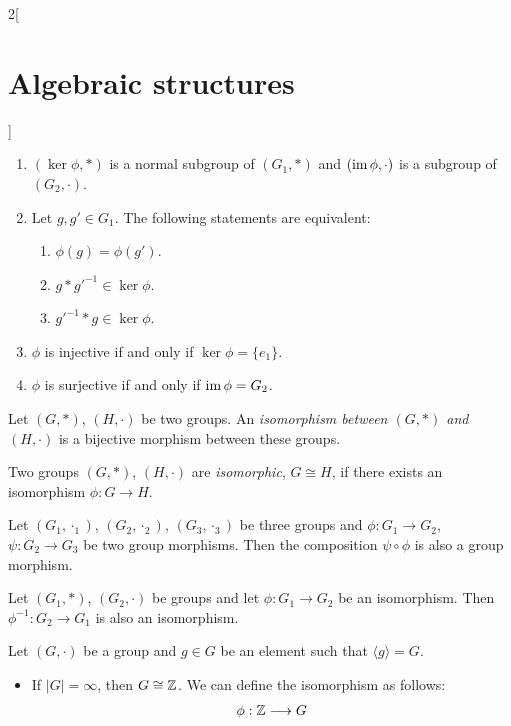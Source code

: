 \documentclass[../../../main.tex]{subfiles}
\begin{document}
\begin{multicols}{2}[\section{Algebraic structures}]
\begin{prop}
    \begin{enumerate}
        \item $(\ker\phi,*)$ is a normal subgroup of $(G_1,*)$ and $(\operatorname{im}\phi,\cdot)$ is a subgroup of $(G_2,\cdot)$.
        \item Let $g,g'\in G_1$. The following statements are equivalent:
        \begin{enumerate}
            \item $\phi(g)=\phi(g')$.
            \item $g*g'^{-1}\in\ker\phi$.
            \item $g'^{-1}*g\in\ker\phi$.
        \end{enumerate}
        \item $\phi$ is injective if and only if $\ker\phi=\{e_1\}$.
        \item $\phi$ is surjective if and only if $\operatorname{im}\phi=G_2$.
    \end{enumerate}
\end{prop}
\begin{definition}
    Let $(G,*)$, $(H,\cdot)$ be two groups. An \textit{isomorphism between $(G,*)$ and $(H,\cdot)$} is a bijective morphism between these groups.
\end{definition}
\begin{definition}
    Two groups $(G,*)$, $(H,\cdot)$ are \textit{isomorphic}, $G\cong H$, if there exists an isomorphism $\phi:G\rightarrow H$.
\end{definition}
\begin{prop}
    Let $(G_1,\cdot_1)$, $(G_2,\cdot_2)$, $(G_3,\cdot_3)$ be three groups and $\phi:G_1\rightarrow G_2$, $\psi:G_2\rightarrow G_3$ be two group morphisms. Then the composition $\psi\circ\phi$ is also a group morphism.
\end{prop}
\begin{prop}
    Let $(G_1,*)$, $(G_2,\cdot)$ be groups and let $\phi: G_1\rightarrow G_2$ be an isomorphism. Then $\phi^{-1}: G_2\rightarrow G_1$ is also an isomorphism.
\end{prop}
\begin{theorem}
    Let $(G,\cdot)$ be a group and $g\in G$ be an element such that $\langle g\rangle=G$.
    \begin{itemize}
        \item If $|G|=\infty$, then $G\cong\mathbb{Z} $. We can define the isomorphism as follows: 
        \begin{align*}
            \phi:\ZZ &\longrightarrow G\\

\end{align*}
\end{itemize}
\end{theorem}
\end{multicols}
\end{document}
